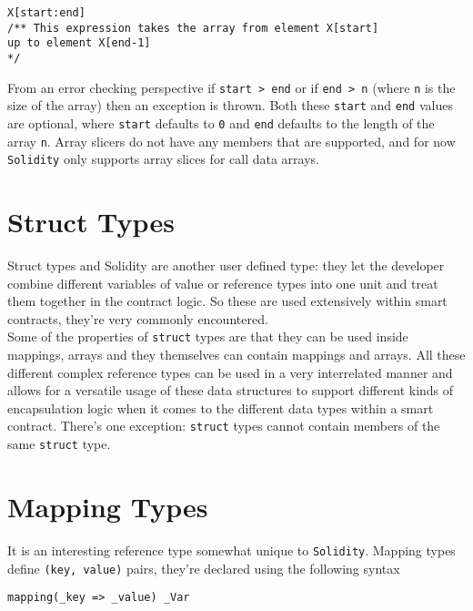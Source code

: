 \begin{lstlisting}[language=Solidity, style=solStyle, caption={Example of array slicing.}]
X[start:end]
/** This expression takes the array from element X[start]
up to element X[end-1]
*/
\end{lstlisting}

From an error checking perspective if \texttt{start > end} or if \texttt{end > n} (where \texttt{n} is the size of the array) then an exception is thrown. Both these \texttt{start} and \texttt{end} values are optional, where \texttt{start} defaults to \texttt{0} and \texttt{end} defaults to the length of the array \texttt{n}. Array slicers do not have any members that are supported, and for now \texttt{Solidity} only supports array slices for call data arrays.

\section{Struct Types}
Struct types and Solidity are another user defined type: they let the developer combine different variables of value or reference types into one unit and treat them together in the contract logic. So these are used extensively within smart contracts, they're very commonly encountered.\\

Some of the properties of \texttt{struct} types are that they can be used inside mappings, arrays and they themselves can contain mappings and arrays. All these different complex reference types can be used in a very interrelated manner and allows for a versatile usage of these data structures to support different kinds of encapsulation logic when it comes to the different data types within a smart contract. There's one exception: \texttt{struct} types cannot contain members of the same \texttt{struct} type.

\section{Mapping Types}
It is an interesting reference type somewhat unique to \texttt{Solidity}. Mapping types define \texttt{(key, value)} pairs, they're declared using the following syntax

\begin{lstlisting}[language=Solidity, style=solStyle, caption={Example of mapping definition}]
mapping(_key => _value) _Var
\end{lstlisting}

